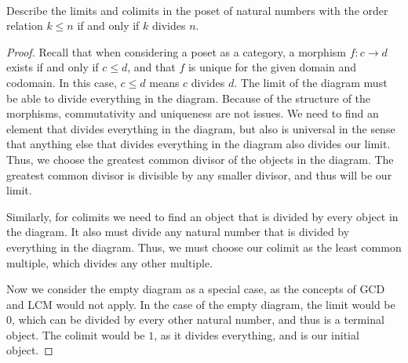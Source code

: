 \documentclass[main.tex]{subfiles}
\author{Teddy Weinberg}
\begin{document}
\paragraph{}
\begin{exercise}
Describe the limits and colimits in the poset of natural numbers with the order
relation $k \le n$ if and only if $k$ divides $n$.
\end{exercise}

\begin{proof}
Recall that when considering a poset as a category, a morphism $f\colon c
\rightarrow d$ exists if and only if $c \le d$, and that $f$ is unique for the
given domain and codomain.  In this case, $c \le d$ means $c$ divides $d$.  The
limit of the diagram must be able to divide everything in the diagram.  Because
of the structure of the morphisms, commutativity and uniqueness are not issues.
We need to find an element that divides everything in the diagram, but also is
universal in the sense that anything else that divides everything in the
diagram also divides our limit.  Thus, we choose the greatest common divisor of
the objects in the diagram.  The greatest common divisor is divisible by any
smaller divisor, and thus will be our limit. 


Similarly, for colimits we need to find an object that is divided by every
object in the diagram.  It also must divide any natural number that is divided
by everything in the diagram.  Thus, we must choose our colimit as the least
common multiple, which divides any other multiple.  

Now we consider the empty diagram as a special case, as the concepts of GCD and
LCM would not apply.  In the case of the empty diagram, the limit would be $0$,
which can be divided by every other natural number, and thus is a terminal
object. The colimit would be $1$, as it divides everything, and is our initial
object.
\end{proof}
\end{document}

